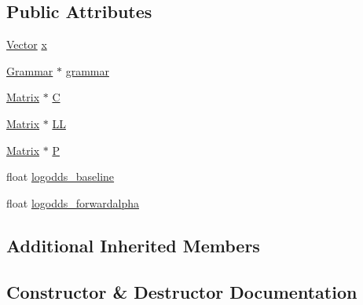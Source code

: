 \subsection*{Public Attributes}
\begin{DoxyCompactItemize}
\item 
\hyperlink{_eigen_numerics_8h_aca2956bc379bce2ed88ab3c0e1b61d1d}{Vector} \hyperlink{class_grammar_hypothesis_a57d7f73f465b70294a8b4ef2b3f5dbbb}{x}
\item 
\hyperlink{class_grammar}{Grammar} $\ast$ \hyperlink{class_grammar_hypothesis_a33e2e7cbb1cbf31c5ec87216ac0494e1}{grammar}
\item 
\hyperlink{_eigen_numerics_8h_a645222978e81acfb2523a9bce34aecc0}{Matrix} $\ast$ \hyperlink{class_grammar_hypothesis_a687b9ff3ffd2c19439707530a5ace6f2}{C}
\item 
\hyperlink{_eigen_numerics_8h_a645222978e81acfb2523a9bce34aecc0}{Matrix} $\ast$ \hyperlink{class_grammar_hypothesis_a39667d9ed2d286c993e28c68e26ddf23}{LL}
\item 
\hyperlink{_eigen_numerics_8h_a645222978e81acfb2523a9bce34aecc0}{Matrix} $\ast$ \hyperlink{class_grammar_hypothesis_aac415f896cdeb3ab3b93bdbc87dc50a4}{P}
\item 
float \hyperlink{class_grammar_hypothesis_a3a18c5d9774339cc2f5e202fd61b0c67}{logodds\+\_\+baseline}
\item 
float \hyperlink{class_grammar_hypothesis_a06e85e0c1a7726714f7f06a4fc0a0618}{logodds\+\_\+forwardalpha}
\end{DoxyCompactItemize}
\subsection*{Additional Inherited Members}


\subsection{Constructor \& Destructor Documentation}
\mbox{\label{class_grammar_hypothesis_a4b5a2b3de673582899de12c773c5e8b7}} 
